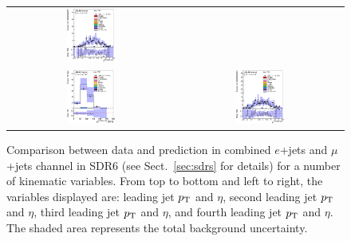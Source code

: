 \begin{figure}[htbp]
\begin{center}
\begin{tabular}{cc}
\includegraphics[width=0.30\textwidth]{appendices/figures/sdrs/JetEta3_ELEMUONCR6_1W_NOMINAL.eps} \\
\includegraphics[width=0.30\textwidth]{appendices/figures/sdrs/JetPt4_ELEMUONCR6_1W_NOMINAL.eps}  &
\includegraphics[width=0.30\textwidth]{appendices/figures/sdrs/JetEta4_ELEMUONCR6_1W_NOMINAL.eps}  \\
\end{tabular}\caption{\small {Comparison between data and prediction in combined $e$+jets and $\mu$+jets channel in SDR6 (see Sect.~\ref{sec:sdrs} for details) 
for a number of kinematic variables. From top to bottom and left to right, the variables displayed are: leading jet $\pt$ and $\eta$,  second leading jet $\pt$ and $\eta$,
third leading jet $\pt$ and $\eta$, and fourth leading jet $\pt$ and $\eta$. The shaded area represents the total background uncertainty.}}
\label{fig:ELEMUONCR6_2}
\end{center}
\end{figure}                                                                             

